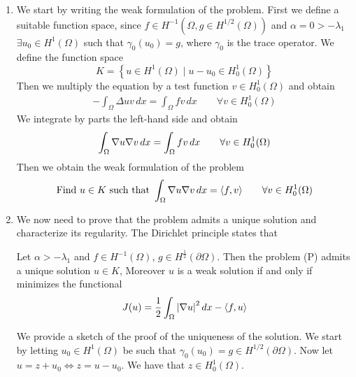 \begin{enumerate}
    \item We start by writing the weak formulation of the problem. First we define a
          suitable function space, since \(f \in H^{-1}(\Omega, g \in H^{1/2}(\Omega))\)
          and \(\alpha = 0 > -\lambda_1\) \(\exists u_0 \in H^1(\Omega)\) such that
          \(\gamma_0(u_0) = g\), where \(\gamma_0\) is the trace operator. We define the
          function space
          \[
              K = \left\{ u \in H^1(\Omega) \mid u - u_0 \in H^1_0(\Omega) \right\}
          \]
          Then we multiply the equation by a test function \(v \in H^1_0(\Omega)\) and
          obtain
          \[
              \begin{split}
                  -\int_\Omega \Delta u v \, dx = \int_\Omega f v \, dx \qquad \forall v \in H^1_0(\Omega)
              \end{split}
          \]
          We integrate by parts the left-hand side and obtain
          \[
              \begin{split}
                  \int_\Omega \nabla u \nabla v \, dx = \int_\Omega f v \, dx \qquad \forall v \in H^1_0(\Omega)
              \end{split}
          \]
          Then we obtain the weak formulation of the problem
          \[
              \begin{split}
                  \text{Find } u \in K \text{ such that } \int_\Omega \nabla u \nabla v \, dx =  \langle f, v \rangle \qquad \forall v \in H^1_0(\Omega)
              \end{split}
          \]
    \item We now need to prove that the problem admits a unique solution and characterize
          its regularity. The Dirichlet principle states that
          \begin{remark}
              Let \(\alpha > -\lambda_1\) and \(f \in H^{-1}(\Omega)\), \(g \in H^{\frac{1}{2}}(\partial\Omega)\). Then the problem (P) admits a unique solution \(u \in K\), Moreover \(u\) is a weak solution if and only if minimizes the functional
              \[
                  J(u) = \frac{1}{2} \int_\Omega \abs{\nabla u}^2 \, dx - \langle f, u \rangle
              \]
          \end{remark}
          We provide a sketch of the proof of the uniqueness of the solution. We start by letting \(u_0 \in H^1(\Omega)\) be such that \(\gamma_0(u_0) = g \in H^{1/2}(\partial\Omega)\). Now let \(u = z + u_0 \iff z = u - u_0\). We have that \(z \in H^1_0(\Omega)\).

\end{enumerate}
